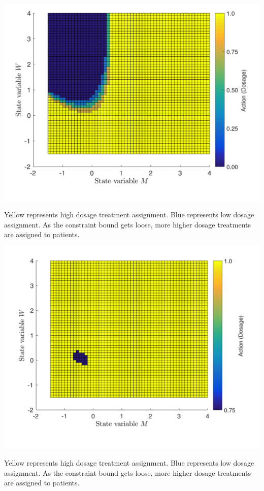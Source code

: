 \documentclass{article}
\begin{document}
		\newpage
	\begin{minipage}{0.95\linewidth}
		\includegraphics[width=\linewidth]{./figs/action_nu15.png}
		\caption*{Yellow represents high dosage treatment assignment. Blue represents low dosage assignment. As the constraint bound gets loose, more higher dosage treatments are assigned to patients.}
	\end{minipage}
		\newpage
	\begin{minipage}{0.95\linewidth}
		\includegraphics[width=\linewidth]{./figs/action_nu20.png}
		\caption*{Yellow represents high dosage treatment assignment. Blue represents low dosage assignment. As the constraint bound gets loose, more higher dosage treatments are assigned to patients.}
	\end{minipage}
\end{document}
